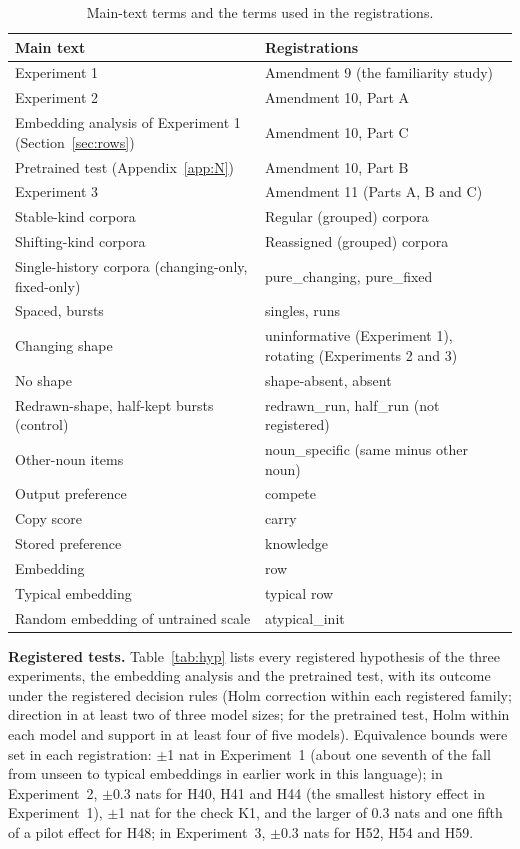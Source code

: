 \begin{table}[!htbp]
\centering\small
\caption{Main-text terms and the terms used in the registrations.}
\label{tab:terms}
\begin{tabular}{@{}ll@{}}
\toprule
Main text & Registrations \\
\midrule
Experiment 1 & Amendment 9 (the familiarity study) \\
Experiment 2 & Amendment 10, Part A \\
Embedding analysis of Experiment 1 (Section~\ref{sec:rows}) & Amendment 10, Part C \\
Pretrained test (Appendix~\ref{app:N}) & Amendment 10, Part B \\
Experiment 3 & Amendment 11 (Parts A, B and C) \\
Stable-kind corpora & Regular (grouped) corpora \\
Shifting-kind corpora & Reassigned (grouped) corpora \\
Single-history corpora (changing-only, fixed-only) & pure\_changing, pure\_fixed \\
Spaced, bursts & singles, runs \\
Changing shape & uninformative (Experiment 1), rotating (Experiments 2 and 3) \\
No shape & shape-absent, absent \\
Redrawn-shape, half-kept bursts (control) & redrawn\_run, half\_run (not registered) \\
Other-noun items & noun\_specific (same minus other noun) \\
Output preference & compete \\
Copy score & carry \\
Stored preference & knowledge \\
Embedding & row \\
Typical embedding & typical row \\
Random embedding of untrained scale & atypical\_init \\
\bottomrule
\end{tabular}
\end{table}

\textbf{Registered tests.} Table~\ref{tab:hyp} lists every registered hypothesis of the three experiments, the embedding analysis and the pretrained test, with its outcome under the registered decision rules (Holm correction within each registered family; direction in at least two of three model sizes; for the pretrained test, Holm within each model and support in at least four of five models). Equivalence bounds were set in each registration: $\pm$1 nat in Experiment~1 (about one seventh of the fall from unseen to typical embeddings in earlier work in this language); in Experiment~2, $\pm$0.3 nats for H40, H41 and H44 (the smallest history effect in Experiment~1), $\pm$1 nat for the check K1, and the larger of 0.3 nats and one fifth of a pilot effect for H48; in Experiment~3, $\pm$0.3 nats for H52, H54 and H59.

